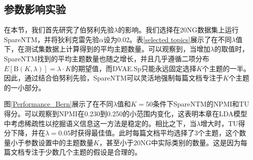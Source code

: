 \begin{table}[ht]
    \centering
    \caption{K=50时，TPTM与SpareNTM在三个伪长文本数据集上的结果}
    \label{TPTM vs SpareNTM}
\end{table}

\subsection{参数影响实验}
在本节，我们首先研究了伯努利先验$\lambda$的影响。我们选择在20NG数据集上运行SpareNTM，并将狄利克雷先验$\alpha$设为0.02。表\ref{selected topics}展示了在不同$\lambda$值下，在测试集数据上计算得到的平均主题数量。可以观察到，当增加$\lambda$的取值时，SpareNTM找到的平均主题数量也随之增长，并且几乎遵循二项分布$E[\mbox{B}(K,\lambda)]=\lambda\cdot K$的期望值，而DVAE.Sp只能永远固定选择$K$个主题的一半。因此，通过结合伯努利先验，SpareNTM可以灵活地强制每篇文档专注于$K$个主题的一小部分。

图\ref{Performance_Bern}展示了在不同$\lambda$值和$K=50$条件下SpareNTM的NPMI和TU得分。可以观察到NPMI在0.230到0.250的小范围内变化，这表明本章在LDA模型中考虑稀疏性以挖掘语义信息这一方法是稳定的。相比之下，当$\lambda$增大时，TU得分下降，并在$\lambda=0.05$时获得最佳值。此时每篇文档平均选择了3个主题，这个数量小于参数设置中的主题数量$K$，甚至小于20NG中实际类别的数量。这是因为每篇文档专注于少数几个主题的假设是合理的。

\begin{table}[ht]
    \centering
    \caption{在20NG上，不同$\lambda$下，SpareNTM选择的平均主题数与DVAE.Sp进行对比} 
    \label{selected topics}
\end{table}

